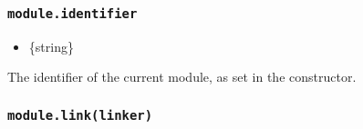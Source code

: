 \subsubsection{\texorpdfstring{\texttt{module.identifier}}{module.identifier}}\label{module.identifier}

\begin{itemize}
\tightlist
\item
  \{string\}
\end{itemize}

The identifier of the current module, as set in the constructor.

\subsubsection{\texorpdfstring{\texttt{module.link(linker)}}{module.link(linker)}}\label{module.linklinker}

